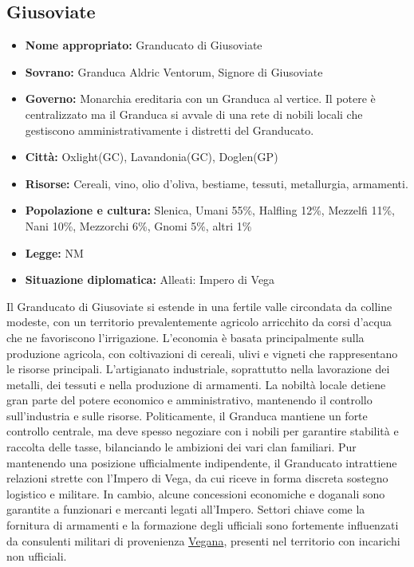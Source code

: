 \documentclass[10pt, a4paper]{report}
\begin{document}
\begin{multicols}{2}
\subsection*{Giusoviate}
\begin{itemize}
	\item \textbf{Nome appropriato:} Granducato di Giusoviate
	\item \textbf{Sovrano:} Granduca Aldric Ventorum, Signore di Giusoviate 
	\item \textbf{Governo:} Monarchia ereditaria con un Granduca al vertice. Il potere è centralizzato ma il Granduca si avvale di una rete di nobili locali che gestiscono amministrativamente i distretti del Granducato.
	\item \textbf{Città:} Oxlight(GC), Lavandonia(GC), Doglen(GP) 
	\item \textbf{Risorse:} Cereali, vino, olio d'oliva, bestiame, tessuti, metallurgia, armamenti.
	\item \textbf{Popolazione e cultura:} Slenica, Umani 55\%, Halfling 12\%, Mezzelfi 11\%, Nani 10\%, Mezzorchi 6\%, Gnomi 5\%, altri 1\%
	\item \textbf{Legge:} NM
	\item \textbf{Situazione diplomatica:} Alleati: Impero di Vega
\end{itemize}
Il Granducato di Giusoviate si estende in una fertile valle circondata da colline modeste, con un territorio prevalentemente agricolo arricchito da corsi d’acqua che ne favoriscono l’irrigazione. L’economia è basata principalmente sulla produzione agricola, con coltivazioni di cereali, ulivi e vigneti che rappresentano le risorse principali. L’artigianato industriale, soprattutto nella lavorazione dei metalli, dei tessuti e nella produzione di armamenti.
La nobiltà locale detiene gran parte del potere economico e amministrativo, mantenendo il controllo sull'industria e sulle risorse. Politicamente, il Granduca mantiene un forte controllo centrale, ma deve spesso negoziare con i nobili per garantire stabilità e raccolta delle tasse, bilanciando le ambizioni dei vari clan familiari.
Pur mantenendo una posizione ufficialmente indipendente, il Granducato intrattiene relazioni strette con l’Impero di Vega, da cui riceve in forma discreta sostegno logistico e militare. In cambio, alcune concessioni economiche e doganali sono garantite a funzionari e mercanti legati all’Impero. Settori chiave come la fornitura di armamenti e la formazione degli ufficiali sono fortemente influenzati da consulenti militari di provenienza \href{https://velvetdogs.com/media/templates_webp/template_blackbeard-writing.webp}{Vegana}, presenti nel territorio con incarichi non ufficiali.



\end{multicols}
\end{document}
